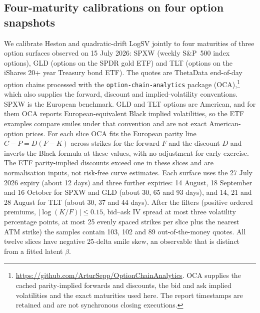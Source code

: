 \subsection{Four-maturity calibrations on four option snapshots}
\label{sec:oca-calibration}
We calibrate Heston and quadratic-drift LogSV jointly to four maturities of three
option surfaces observed on 15 July 2026: SPXW (weekly S\&P~500 index options), GLD
(options on the SPDR gold ETF) and TLT (options on the iShares 20+ year Treasury
bond ETF). The quotes are
ThetaData end-of-day option chains processed with the \texttt{option-chain-analytics}
package (OCA),\footnote{\url{https://github.com/ArturSepp/OptionChainAnalytics}. OCA
supplies the cached parity-implied forwards and discounts, the bid and ask implied
volatilities and the exact maturities used here. The report timestamps are
retained and are not synchronous closing executions.} which also supplies the
forward, discount and implied-volatility conventions. SPXW is the European
benchmark. GLD and TLT options are American, and for them OCA reports
European-equivalent Black implied volatilities, so the ETF examples compare smiles
under that convention and are not exact American-option prices. For each slice OCA
fits the European parity line $C-P=D(F-K)$ across strikes for the forward $F$ and
the discount $D$ and inverts the Black formula at these values, with no adjustment
for early exercise.
The ETF parity-implied
discounts exceed one in these slices and are normalisation inputs, not risk-free
curve estimates. Each surface uses the 27 July 2026 expiry (about 12 days) and
three further expiries: 14 August, 18 September and 16 October for SPXW and GLD
(about 30, 65 and 93 days), and 14, 21 and 28 August for TLT (about 30, 37 and 44
days). After the filters (positive ordered premiums, $|\log(K/F)|\leq0.15$, bid--ask
IV spread at most three volatility percentage points, at most 25 evenly spaced
strikes per slice plus the nearest ATM strike) the samples contain 103, 102 and 89
out-of-the-money quotes. All twelve slices have negative 25-delta smile skew, an
observable that is distinct from a fitted latent $\beta$.

